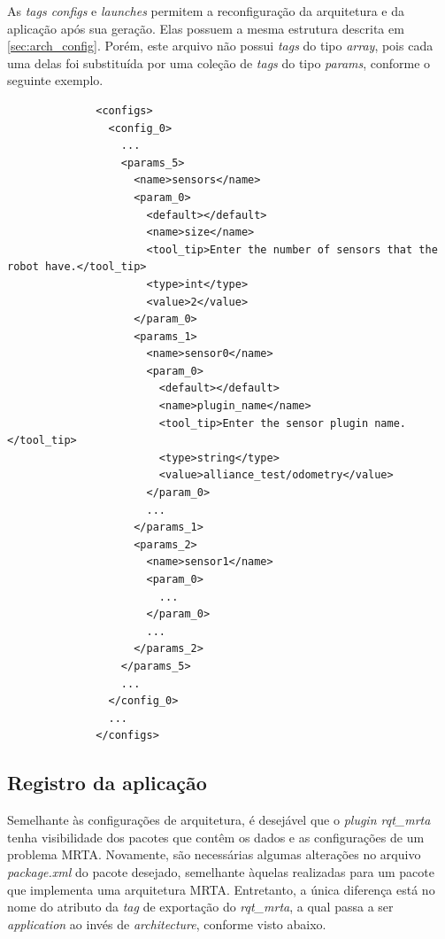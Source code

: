             As \textit{tags configs} e \textit{launches} permitem a reconfiguração da arquitetura e da aplicação após sua geração. Elas possuem a mesma estrutura descrita em \ref{sec:arch_config}. Porém, este arquivo não possui \textit{tags} do tipo \textit{array}, pois cada uma delas foi substituída por uma coleção de \textit{tags} do tipo \textit{params}, conforme o seguinte exemplo. %
            
            \begin{lstlisting}
              <configs>
                <config_0>
                  ...
                  <params_5>
                    <name>sensors</name>
                    <param_0>
                      <default></default>
                      <name>size</name>
                      <tool_tip>Enter the number of sensors that the robot have.</tool_tip>
                      <type>int</type>
                      <value>2</value>
                    </param_0>
                    <params_1>
                      <name>sensor0</name>
                      <param_0>
                        <default></default>
                        <name>plugin_name</name>
                        <tool_tip>Enter the sensor plugin name.</tool_tip>
                        <type>string</type>
                        <value>alliance_test/odometry</value>
                      </param_0>
                      ...
                    </params_1>
                    <params_2>
                      <name>sensor1</name>
                      <param_0>
                        ...
                      </param_0>
                      ...
                    </params_2>
                  </params_5>
                  ...
                </config_0>
                ...
              </configs>
            \end{lstlisting}
            
        \subsection{Registro da aplicação} \label{subsec:app_config_rgst}
            Semelhante às configurações de arquitetura, é desejável que o \textit{plugin rqt\_mrta} tenha visibilidade dos pacotes que contêm os dados e as configurações de um problema MRTA. Novamente, são necessárias algumas alterações no arquivo \textit{package.xml} do pacote desejado, semelhante àquelas realizadas para um pacote que implementa uma arquitetura MRTA. Entretanto, a única diferença está no nome do atributo da \textit{tag} de exportação do \textit{rqt\_mrta}, a qual passa a ser \textit{application} ao invés de \textit{architecture}, conforme visto abaixo.
            
